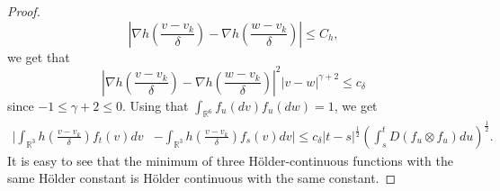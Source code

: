 \documentclass[11pt,a4paper]{article}
\theoremstyle{definition}
\theoremstyle{plain}
\begin{document}
\begin{proof}
    $$\left\vert\nabla h\left(\frac{v-v_k}{\delta}\right)- \nabla h\left(\frac{w-v_k}{\delta}\right)\right\vert \leq C_h,$$
    we get that
    $$\left\vert\nabla h\left(\frac{v-v_k}{\delta}\right) - \nabla h\left(\frac{w-v_k}{\delta}\right)\right\vert^2\vert v-w\vert ^{\gamma+2} \leq c_\delta$$
    since $-1\leq \gamma+2 \leq0$. Using that $\int_{\mathbb{R}^6} f_u(dv)f_u(dw)=1$, we get
    \begin{align*}
     \bigg\vert\int_{\mathbb{R}^3} h\left(\frac{v-v_k}{\delta}\right) f_t(v)dv&-\int_{\mathbb{R}^3} h\left(\frac{v-v_k}{\delta}\right) f_s(v) dv \bigg\vert
     \leq c_\delta \vert t-s\vert^\frac{1}{2}\left(\int_s^t D(f_u \otimes f_u)du\right)^\frac{1}{2}.
    \end{align*}
    It is easy to see that the minimum of three Hölder-continuous functions with the same Hölder constant is Hölder continuous with the same constant.
\end{proof}
\end{document}
